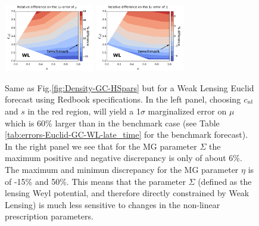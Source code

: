 \begin{figure}[htbp]
\centering{}
\includegraphics[width=0.35\textwidth]{Chapters/linear-nonlinear-MG-forecasts/figures/DensityPlots/WL-Zhao-effect-mu.pdf}
\includegraphics[width=0.35\textwidth]{Chapters/linear-nonlinear-MG-forecasts/figures/DensityPlots/WL-Zhao-effect-Sigma.pdf}
\caption[Effect of the HS non-linear prescription on parameter estimation for WL in MG.]{\label{fig:Density-WL-HSpars}
Same as Fig.\ref{fig:Density-GC-HSpars} but for a Weak Lensing Euclid forecast using Redbook specifications.
In the left panel, choosing $c_{\mathrm{nl}}$
and $s$ in the red region, will yield a 1$\sigma$ marginalized
error on $\mu$ which is 60\% larger than in the benchmark case
(see Table \ref{tab:errors-Euclid-GC-WL-late_time}
for the benchmark forecast). In the right panel we see that for the MG parameter $\Sigma$ the maximum positive and negative discrepancy
is only of about 6\%. The maximum and minimun discrepancy for the MG parameter $\eta$ is of -15\% and 50\%. This means that
the parameter $\Sigma$ (defined as the lensing Weyl potential, and therefore directly constrained by Weak Lensing) 
is much less sensitive to changes in the non-linear prescription parameters.}
\end{figure}


